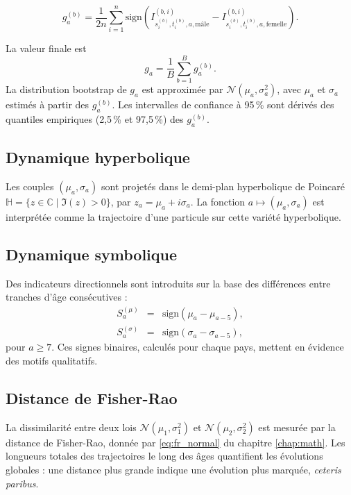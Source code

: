 \begin{equation}
	g_a^{(b)} = \frac{1}{2n}\sum_{i=1}^n \mathrm{sign} \left(I_{s_i^{(b)}, t_i^{(b)}, a, \mathrm{mâle}}^{(b,i)} -
	I_{s_i^{(b)}, t_i^{(b)}, a, \mathrm{femelle}}^{(b,i)}
	 \right).
\end{equation}

La valeur finale est
\begin{equation}
g_a = \frac{1}{B} \sum_{b=1}^B g_a^{(b)}.
\end{equation}
La distribution bootstrap de $g_a$ est approximée par $\mathcal{N}(\mu_a, \sigma_a^2)$, avec $\mu_a$ et $\sigma_a$ estimés à partir des $g_a^{(b)}$. Les intervalles de confiance à 95\,\% sont dérivés des quantiles empiriques (2,5\,\% et 97,5\,\%) des $g_a^{(b)}$.

\subsection{Dynamique hyperbolique}

Les couples $(\mu_a, \sigma_a)$ sont projetés dans le demi-plan hyperbolique de Poincaré $\mathbb{H} = \{ z \in \mathbb{C} \mid \Im(z) > 0 \}$, par $z_a = \mu_a + i \sigma_a$. La fonction $a \mapsto (\mu_a, \sigma_a)$ est interprétée comme la trajectoire d'une particule sur cette variété hyperbolique.

\subsection{Dynamique symbolique}

Des indicateurs directionnels sont introduits sur la base des différences entre tranches d'âge consécutives :
\begin{eqnarray}
	S_a^{(\mu)} &=& \mathrm{sign}(\mu_a - \mu_{a-5}), \\
	S_a^{(\sigma)} &=& \mathrm{sign}(\sigma_a - \sigma_{a-5}),
\end{eqnarray}
pour $a \geq 7$. Ces signes binaires, calculés pour chaque pays, mettent en évidence des motifs qualitatifs.

\subsection{Distance de Fisher-Rao}

La dissimilarité entre deux lois $\mathcal{N}(\mu_1, \sigma_1^2)$ et $\mathcal{N}(\mu_2, \sigma_2^2)$ est mesurée par la distance de Fisher-Rao, donnée par \eqref{eq:fr_normal} du chapitre \ref{chap:math}. Les longueurs totales des trajectoires le long des âges quantifient les évolutions globales : une distance plus grande indique une évolution plus marquée, \emph{ceteris paribus}.

